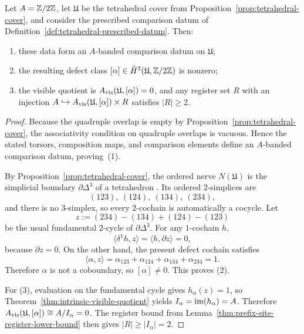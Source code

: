 \begin{proposition}
\label{thm:forced-obstruction}
Let $A=\mathbb{Z}/2\mathbb{Z}$, let $\mathfrak{U}$ be the tetrahedral cover from
Proposition~\ref{prop:tetrahedral-cover}, and consider the prescribed
comparison datum of Definition~\ref{def:tetrahedral-prescribed-datum}.
Then:
\begin{enumerate}[label=\textup{(\arabic*)}]
\item these data form an $A$-banded comparison datum on $\mathfrak{U}$;
\item the resulting defect class
$[\alpha]\in\check{H}^2(\mathfrak{U},\mathbb{Z}/2\mathbb{Z})$ is nonzero;
\item the visible quotient is $A_{\mathrm{vis}}(\mathfrak{U},[\alpha])=0$, and any register set
$R$ with an injection $A\hookrightarrow A_{\mathrm{vis}}(\mathfrak{U},[\alpha])\times R$ satisfies
$|R|\ge 2$.
\end{enumerate}
\end{proposition}

\begin{proof}
Because the quadruple overlap is empty by
Proposition~\ref{prop:tetrahedral-cover}, the associativity condition on
quadruple overlaps is vacuous.  Hence the stated torsors, composition maps, and
comparison elements define an $A$-banded comparison datum, proving~\textup{(1)}.

By Proposition~\ref{prop:tetrahedral-cover}, the ordered nerve
$N(\mathfrak{U})$ is the simplicial boundary $\partial\Delta^3$ of a tetrahedron
\cite{HatcherAlgebraicTopology}.  Its ordered $2$-simplices are
\[
(123),\ (124),\ (134),\ (234),
\]
and there is no $3$-simplex, so every $2$-cochain is automatically a cocycle.
Let
\[
z:=(234)-(134)+(124)-(123)
\]
be the usual fundamental $2$-cycle of $\partial\Delta^3$.  For any $1$-cochain
$h$,
\[
\langle \delta^1 h,z\rangle = \langle h,\partial z\rangle = 0,
\]
because $\partial z=0$.  On the other hand, the present defect cochain satisfies
\[
\langle \alpha,z\rangle
=
\alpha_{123}+\alpha_{124}+\alpha_{134}+\alpha_{234}
=
1.
\]
Therefore $\alpha$ is not a coboundary, so $[\alpha]\neq 0$.  This proves
\textup{(2)}.

For \textup{(3)}, evaluation on the fundamental cycle gives
$h_\alpha(z)=1$, so
Theorem~\ref{thm:intrinsic-visible-quotient} yields
$I_\alpha=\operatorname{im}(h_\alpha)=A$.  Therefore
$A_{\mathrm{vis}}(\mathfrak{U},[\alpha])\cong A/I_\alpha=0$.  The register bound from
Lemma~\ref{thm:prefix-site-register-lower-bound} then gives
$|R|\ge |I_\alpha|=2$.
\end{proof}

